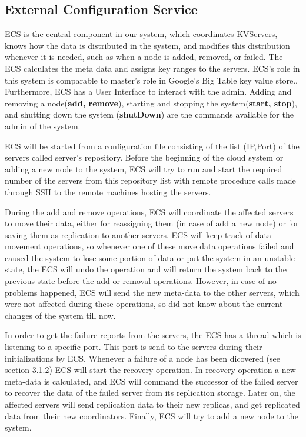 \documentclass{sig-alternate}
\begin{document}
\subsection{External Configuration Service}
ECS is the central component in our system, which coordinates KVServers, knows how the data is distributed in the system, and modifies this distribution whenever it is needed, such as when a node is added, removed, or failed. The ECS calculates the meta data and assigns key ranges to the servers. ECS's role in this system is comparable to master's role in Google's Big Table key value store.\cite{bigTable}. Furthermore, ECS has a User Interface to interact with the admin. Adding and removing a node(\textbf{add, remove}), starting and stopping the system(\textbf{start, stop}), and shutting down the system (\textbf{shutDown}) are the commands available for the admin of the system.

ECS will be started from a configuration file consisting of the list (IP,Port) of the servers called server's repository. Before the beginning of the cloud system or adding a new node to the system, ECS will try to run and start the required number of the servers from this repository list with remote procedure calls made through SSH to the remote machines hosting the servers. 

During the add and remove operations, ECS will coordinate the affected servers to move their data, either for reassigning them (in case of add a new node) or for saving them as replication to another servers. ECS will keep track of data movement operations, so whenever one of these move data operations failed and caused the system to lose some portion of data or put the system in an unstable state, the ECS will undo the operation and will return the system back to the previous state before the add or removal operations. However, in case of no problems happened, ECS will send the new meta-data to the other servers, which were not affected during these operations, so did not know about the current changes of the system till now.

In order to get the failure reports from the servers, the ECS has a thread which is listening to a specific port. This port is send to the servers during their initializations by ECS. Whenever a failure of a node has been dicovered (see section 3.1.2) %
ECS will start the recovery operation. In recovery operation a new meta-data is calculated, and ECS will command the successor of the failed server to recover the data of the failed server from its replication storage. Later on, the affected servers will send replication data to their new replicas, and get replicated data from their new coordinators. Finally, ECS will try to add a new node to the system.
\end{document}
